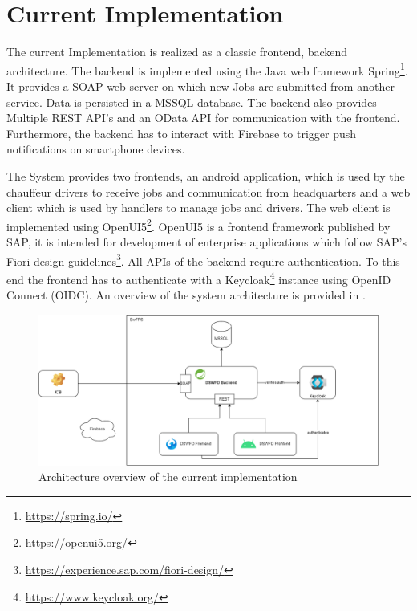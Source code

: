 \section{Current Implementation}


The current Implementation is realized as a classic frontend, backend architecture. The backend is implemented using the Java web framework Spring\footnote{\url{https://spring.io/}}. It provides a SOAP web server on which new Jobs are submitted from another service. Data is persisted in a MSSQL database. The backend also provides Multiple REST API's and an OData API for communication with the frontend. Furthermore, the backend has to interact with Firebase to trigger push notifications on smartphone devices.

The System provides two frontends, an android application, which is used by the chauffeur drivers to receive jobs and communication from headquarters and a web client which is used by handlers to manage jobs and drivers. The web client is implemented using OpenUI5\footnote{\url{https://openui5.org/}}. OpenUI5 is a frontend framework published by SAP, it is intended for development of enterprise applications which follow SAP's Fiori design guidelines\footnote{\url{https://experience.sap.com/fiori-design/}}. All APIs of the backend require authentication. To this end the frontend has to authenticate with a Keycloak\footnote{\url{https://www.keycloak.org/}} instance using OpenID Connect (OIDC). An overview of the system architecture is provided in .

\begin{figure}[ht]
    \centering
    \includegraphics[width=.8\linewidth]{assets/dswfd-architecture}
    \caption{Architecture overview of the current implementation}
    \label{fig:dswfd-architecture}
\end{figure}

